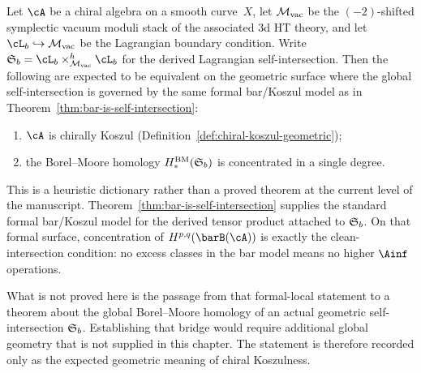\begin{conjecture}
\label{conj:koszul-lagrangian-concentration}
Let $\cA$ be a chiral algebra on a smooth curve~$X$, let
$\mathcal{M}_{\mathrm{vac}}$ be the $(-2)$-shifted symplectic vacuum moduli stack of
the associated 3d HT theory, and let
$\cL_b \hookrightarrow \Mvac$ be the Lagrangian boundary condition.
Write $\Steinb_b = \cL_b \times_{\Mvac}^h \cL_b$ for the derived
Lagrangian self-intersection. Then the following are expected to be
equivalent on the geometric surface where the global
self-intersection is governed by the same formal bar/Koszul model as
in Theorem~\ref{thm:bar-is-self-intersection}:
\begin{enumerate}[label=\textup{(\roman*)}]
\item $\cA$ is chirally Koszul
 \textup{(}Definition~\textup{\ref{def:chiral-koszul-geometric})};
\item the Borel--Moore homology $H_*^{\mathrm{BM}}(\mathfrak{S}_b)$ is
 concentrated in a single degree.
\end{enumerate}
\end{conjecture}

\begin{remark}[Evidence]
This is a heuristic dictionary rather than a proved theorem at the
current level of the manuscript. Theorem~\ref{thm:bar-is-self-intersection}
supplies the standard formal bar/Koszul model for the derived tensor
product attached to $\mathfrak{S}_b$. On that formal surface,
concentration of $H^{p,q}(\barB(\cA))$ is exactly the clean-intersection
condition: no excess classes in the bar model means no higher
$\Ainf$ operations.

What is not proved here is the passage from that formal-local statement
to a theorem about the global Borel--Moore homology of an actual
geometric self-intersection $\mathfrak{S}_b$. Establishing that bridge
would require additional global geometry that is not supplied in this
chapter. The statement is therefore recorded only as the expected
geometric meaning of chiral Koszulness.
\end{remark}

